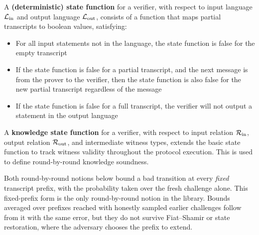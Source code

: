 \begin{definition}
    \label{def:state_function}
    A \textbf{(deterministic) state function} for a verifier, with respect to input language \(\mathcal{L}_{\mathrm{in}}\) and
    output language \(\mathcal{L}_{\mathrm{out}}\), consists of a function that maps partial transcripts to boolean values, satisfying:
    \begin{itemize}
        \item For all input statements not in the language, the state function is false for the empty transcript
        \item If the state function is false for a partial transcript, and the next message is from the
        prover to the verifier, then the state function is also false for the new partial transcript
        regardless of the message
        \item If the state function is false for a full transcript, the verifier will not output a statement
        in the output language
    \end{itemize}
    \leanok
\end{definition}

\begin{definition}
    \label{def:knowledge_state_function}
    A \textbf{knowledge state function} for a verifier, with respect to input relation \(\mathcal{R}_{\mathrm{in}}\), output
    relation \(\mathcal{R}_{\mathrm{out}}\), and intermediate witness types, extends the basic state function to track
    witness validity throughout the protocol execution. This is used to define round-by-round knowledge soundness.
    \leanok
\end{definition}

Both round-by-round notions below bound a bad transition at every \emph{fixed} transcript prefix,
with the probability taken over the fresh challenge alone. This fixed-prefix form is the only
round-by-round notion in the library. Bounds averaged over prefixes reached with honestly sampled
earlier challenges follow from it with the same error, but they do not survive Fiat--Shamir or
state restoration, where the adversary chooses the prefix to extend.

